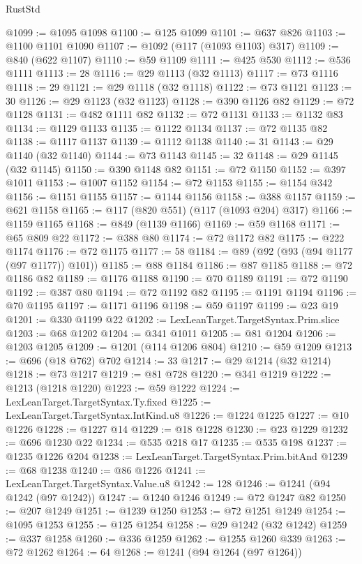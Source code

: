 \begin{lexlean}{RustStd}
\begin{coremodule}
@1099 := @1095 @1098
@1100 := @125 @1099
@1101 := @637 @826
@1103 := @1100 @1101 @1090
@1107 := @1092 (@117 (@1093 @1103) @317)
@1109 := @840 (@622 @1107)
@1110 := @59 @1109
@1111 := @425 @530
@1112 := @536 @1111
@1113 := 28
@1116 := @29 @1113 (@32 @1113)
@1117 := @73 @1116
@1118 := 29
@1121 := @29 @1118 (@32 @1118)
@1122 := @73 @1121
@1123 := 30
@1126 := @29 @1123 (@32 @1123)
@1128 := @390 @1126 @82
@1129 := @72 @1128
@1131 := @482 @1111 @82
@1132 := @72 @1131
@1133 := @1132 @83
@1134 := @1129 @1133
@1135 := @1122 @1134
@1137 := @72 @1135 @82
@1138 := @1117 @1137
@1139 := @1112 @1138
@1140 := 31
@1143 := @29 @1140 (@32 @1140)
@1144 := @73 @1143
@1145 := 32
@1148 := @29 @1145 (@32 @1145)
@1150 := @390 @1148 @82
@1151 := @72 @1150
@1152 := @397 @1011
@1153 := @1007 @1152
@1154 := @72 @1153
@1155 := @1154 @342
@1156 := @1151 @1155
@1157 := @1144 @1156
@1158 := @388 @1157
@1159 := @621 @1158
@1165 := @117 (@820 @551) (@117 (@1093 @204) @317)
@1166 := @1159 @1165
@1168 := @849 (@1139 @1166)
@1169 := @59 @1168
@1171 := @65 @809 @22
@1172 := @388 @80
@1174 := @72 @1172 @82
@1175 := @222 @1174
@1176 := @72 @1175
@1177 := 58
@1184 := @89 (@92 (@93 (@94 @1177 (@97 @1177)) @101))
@1185 := @88 @1184
@1186 := @87 @1185
@1188 := @72 @1186 @82
@1189 := @1176 @1188
@1190 := @70 @1189
@1191 := @72 @1190
@1192 := @387 @80
@1194 := @72 @1192 @82
@1195 := @1191 @1194
@1196 := @70 @1195
@1197 := @1171 @1196
@1198 := @59 @1197
@1199 := @23 @19
@1201 := @330 @1199 @22
@1202 := LexLeanTarget.TargetSyntax.Prim.slice
@1203 := @68 @1202
@1204 := @341 @1011
@1205 := @81 @1204
@1206 := @1203 @1205
@1209 := @1201 (@114 @1206 @804)
@1210 := @59 @1209
@1213 := @696 (@18 @762) @702
@1214 := 33
@1217 := @29 @1214 (@32 @1214)
@1218 := @73 @1217
@1219 := @81 @728
@1220 := @341 @1219
@1222 := @1213 (@1218 @1220)
@1223 := @59 @1222
@1224 := LexLeanTarget.TargetSyntax.Ty.fixed
@1225 := LexLeanTarget.TargetSyntax.IntKind.u8
@1226 := @1224 @1225
@1227 := @10 @1226
@1228 := @1227 @14
@1229 := @18 @1228
@1230 := @23 @1229
@1232 := @696 @1230 @22
@1234 := @535 @218 @17
@1235 := @535 @198
@1237 := @1235 @1226 @204
@1238 := LexLeanTarget.TargetSyntax.Prim.bitAnd
@1239 := @68 @1238
@1240 := @86 @1226
@1241 := LexLeanTarget.TargetSyntax.Value.u8
@1242 := 128
@1246 := @1241 (@94 @1242 (@97 @1242))
@1247 := @1240 @1246
@1249 := @72 @1247 @82
@1250 := @207 @1249
@1251 := @1239 @1250
@1253 := @72 @1251 @1249
@1254 := @1095 @1253
@1255 := @125 @1254
@1258 := @29 @1242 (@32 @1242)
@1259 := @337 @1258
@1260 := @336 @1259
@1262 := @1255 @1260 @339
@1263 := @72 @1262
@1264 := 64
@1268 := @1241 (@94 @1264 (@97 @1264))

\end{coremodule}
\end{lexlean}
